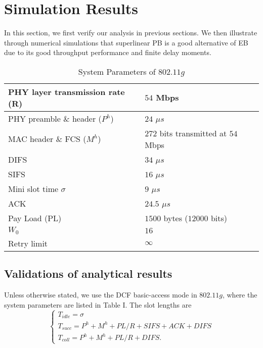 \documentclass[journal]{IEEEtran}
\begin{document}
\section{Simulation Results}
In this section, we first verify our analysis in previous sections. We then illustrate through numerical simulations that superlinear PB is a good alternative of EB due to its good throughput performance and finite delay moments.

\begin{table}
\footnotesize
\caption{System Parameters of $802.11g$}
\begin{center}
\begin{tabular}{|l|l|}
\hline
 PHY layer transmission rate (R)          &   $54$ Mbps    \\ \hline
 PHY preamble \& header  ($P^h$)          &   $24$ $\mu s$  \\ \hline
 MAC header \& FCS    ($M^h$)             &   $272$ bits transmitted at $54$ Mbps    \\ \hline
 DIFS                                     &   $34$ $\mu s$    \\ \hline
 SIFS                                     &   $16$ $\mu s$    \\ \hline
 Mini slot time $\sigma$                  &   $9$ $\mu s$    \\ \hline
 ACK                                      &   $24.5$ $\mu s$           \\ \hline
 Pay Load (PL)                            &   $1500$ bytes ($12000$ bits)  \\ \hline
 $W_0$                                    &   $16$            \\ \hline
 Retry limit                              &   $\infty$           \\ \hline
\end{tabular}
\end{center}
\end{table}

\subsection{Validations of analytical results}
Unless otherwise stated, we use the DCF basic-access mode in $802.11g$, where the system parameters are listed in Table I. The slot lengths are
\begin{equation*}
\begin{cases}
T_{idle} = \sigma \\
T_{succ} = P^h + M^h + PL/R + SIFS + ACK + DIFS\\
T_{coll} = P^h + M^h + PL/R + DIFS.
\end{cases}
\end{equation*}
\end{document}
